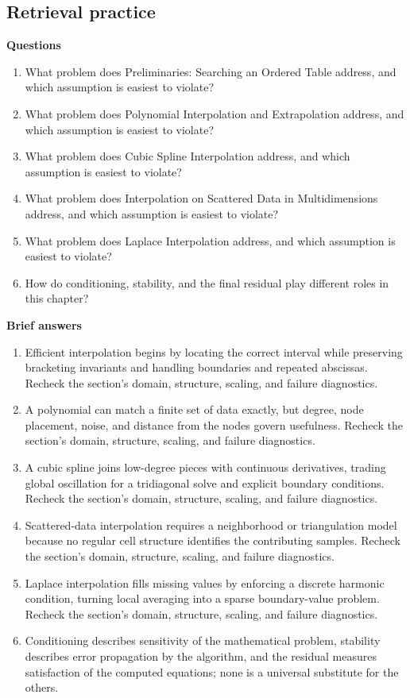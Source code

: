 \documentclass[10pt,letterpaper]{article}
\begin{document}
\subsection*{Retrieval practice}
\textbf{Questions}
\begin{enumerate}
\item What problem does Preliminaries: Searching an Ordered Table address, and which assumption is easiest to violate?
\item What problem does Polynomial Interpolation and Extrapolation address, and which assumption is easiest to violate?
\item What problem does Cubic Spline Interpolation address, and which assumption is easiest to violate?
\item What problem does Interpolation on Scattered Data in Multidimensions address, and which assumption is easiest to violate?
\item What problem does Laplace Interpolation address, and which assumption is easiest to violate?
\item How do conditioning, stability, and the final residual play different roles in this chapter?
\end{enumerate}

\textbf{Brief answers}
\begin{enumerate}
\item Efficient interpolation begins by locating the correct interval while preserving bracketing invariants and handling boundaries and repeated abscissas. Recheck the section's domain, structure, scaling, and failure diagnostics.
\item A polynomial can match a finite set of data exactly, but degree, node placement, noise, and distance from the nodes govern usefulness. Recheck the section's domain, structure, scaling, and failure diagnostics.
\item A cubic spline joins low-degree pieces with continuous derivatives, trading global oscillation for a tridiagonal solve and explicit boundary conditions. Recheck the section's domain, structure, scaling, and failure diagnostics.
\item Scattered-data interpolation requires a neighborhood or triangulation model because no regular cell structure identifies the contributing samples. Recheck the section's domain, structure, scaling, and failure diagnostics.
\item Laplace interpolation fills missing values by enforcing a discrete harmonic condition, turning local averaging into a sparse boundary-value problem. Recheck the section's domain, structure, scaling, and failure diagnostics.
\item Conditioning describes sensitivity of the mathematical problem, stability describes error propagation by the algorithm, and the residual measures satisfaction of the computed equations; none is a universal substitute for the others.
\end{enumerate}
\end{document}

